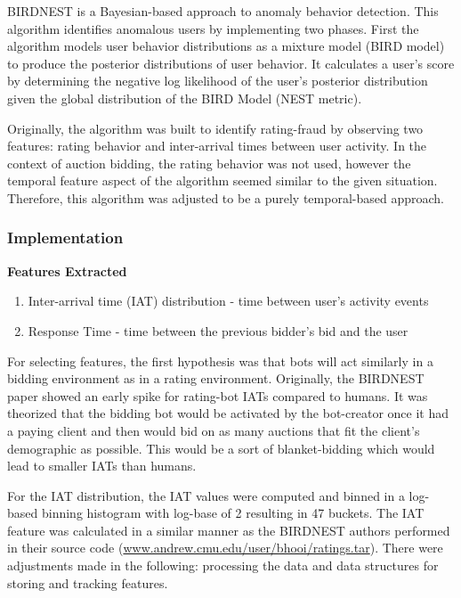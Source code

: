 \documentclass{article} %
\begin{document}
BIRDNEST \cite{birdnest} is a Bayesian-based approach to anomaly behavior detection. This algorithm identifies anomalous users by implementing two phases. First the algorithm models user behavior distributions as a mixture model (BIRD model) to produce the posterior distributions of user behavior. It calculates a user's score by determining the negative log likelihood of the user's posterior distribution given the global distribution of the BIRD Model (NEST metric).

Originally, the algorithm was built to identify rating-fraud by observing two features: rating behavior and inter-arrival times between user activity. In the context of auction bidding, the rating behavior was not used, however the temporal feature aspect of the algorithm seemed similar to the given situation. Therefore, this algorithm was adjusted to be a purely temporal-based approach.
	
\subsubsection{Implementation}

\textbf{Features Extracted} 

\begin{enumerate}
\item Inter-arrival time (IAT) distribution - time between user's activity events
\item Response Time - time between the previous bidder's bid and the user
\end{enumerate}

For selecting features, the first hypothesis was that bots will act similarly in a bidding environment as in a rating environment. Originally, the BIRDNEST paper showed an early spike for rating-bot IATs compared to humans. It was theorized that the bidding bot would be activated by the bot-creator once it had a paying client and then would bid on as many auctions that fit the client's demographic as possible. This would be a sort of blanket-bidding which would lead to smaller IATs than humans.

For the IAT distribution, the IAT values were computed and binned in a log-based binning histogram with log-base of 2 resulting in 47 buckets. The IAT feature was calculated in a similar manner as the BIRDNEST authors performed in their source code (\url{www.andrew.cmu.edu/user/bhooi/ratings.tar}). There were adjustments made in the following: processing the data and data structures for storing and tracking features.
\end{document}
